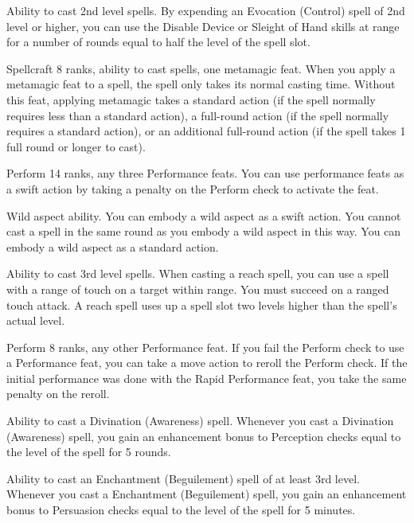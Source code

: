  Ability to cast 2nd level spells.
 By expending an Evocation (Control) spell of 2nd level or higher, you can use the Disable Device or Sleight of Hand skills at \rngclose range for a number of rounds equal to half the level of the spell slot.

 Spellcraft 8 ranks, ability to cast spells, one metamagic feat.
 When you apply a metamagic feat to a spell, the spell only takes its normal casting time.
 Without this feat, applying metamagic takes a standard action (if the spell normally requires less than a standard action), a full-round action (if the spell normally requires a standard action), or an additional full-round action (if the spell takes 1 full round or longer to cast).

\featpre Perform 14 ranks, any three Performance feats.
\featben You can use performance feats as a swift action by taking a  penalty on the Perform check to activate the feat.

\featpre Wild aspect ability.
\featben You can embody a wild aspect as a swift action. You cannot cast a spell in the same round as you embody a wild aspect in this way.
 You can embody a wild aspect as a standard action.

 Ability to cast 3rd level spells.
 When casting a reach spell, you can use a spell with a range of touch on a target within \rngclose range. You must succeed on a ranged touch attack. A reach spell uses up a spell slot two levels higher than the spell's actual level.

\featpre Perform 8 ranks, any other Performance feat.
\featben If you fail the Perform check to use a Performance feat, you can take a move action to reroll the Perform check. If the initial performance was done with the Rapid Performance feat, you take the same  penalty on the reroll.

\featpre Ability to cast a Divination (Awareness) spell.
\featben Whenever you cast a Divination (Awareness) spell, you gain an enhancement bonus to Perception checks equal to the level of the spell for 5 rounds.

\featpre Ability to cast an Enchantment (Beguilement) spell of at least 3rd level.
\featben Whenever you cast a Enchantment (Beguilement) spell, you gain an enhancement bonus to Persuasion checks equal to the level of the spell for 5 minutes.

